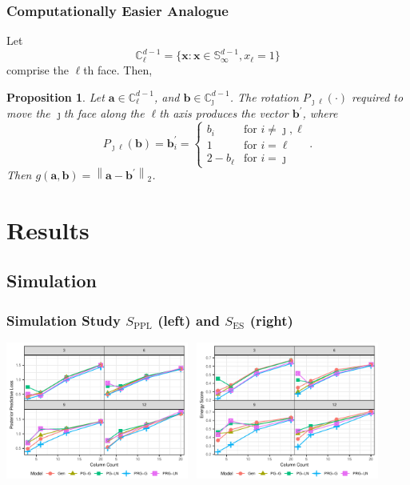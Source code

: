 \documentclass[aspectratio=169]{beamer}
\newcommand{\norm}[1]{\left\lVert #1 \right\rVert}
\newcommand{\pnorm}[2]{\norm{#1}_{#2}}
\newtheorem{prop}{Proposition}
\begin{document}
\begin{frame}
  \frametitle{Computationally Easier Analogue}
  Let \[
      {\mathbb C}_{\ell}^{d-1} = \lbrace \bm{x} : \bm{x} \in {\mathbb S}_{\infty}^{d-1}, x_{\ell} = 1\rbrace
    \] comprise the $\ell$th face.  Then,
  \begin{prop}
    Let $\bm{a} \in {\mathbb C}_{\ell}^{d-1}$, and
    $\bm{b} \in {\mathbb C}_{\jmath}^{d-1}$.  The rotation
    $P_{\jmath\ell}(\cdot)$ required to move the $\jmath$th face
    along the $\ell$th axis produces the vector $\bm{b}^\prime$, where
      \begin{equation}
        \label{eqn:rotation}
        P_{\jmath\ell}(\bm{b}) = \bm{b}^{\prime}_i =
        \begin{cases}
            b_{i} &\text{for }i\neq \jmath,\ell\\
            1 &\text{for }i = \ell\\
            2 - b_{\ell} &\text{for }i = \jmath
        \end{cases}.
      \end{equation}
      Then $g(\bm{a},\bm{b}) = \pnorm{\bm{a} - \bm{b}^{\prime}}{2}$.
  \end{prop}
\end{frame}

\section{Results}
\subsection{Simulation}
\begin{frame}
  \frametitle{Simulation Study $S_{\text{PPL}}$ (left) and $S_{\text{ES}}$ (right)}
  \begin{center}
    \includegraphics[width=0.45\textwidth]{./images/simulation_ppl}~
    \hfill
    \includegraphics[width=0.45\textwidth]{./images/simulation_es}~
  \end{center}
\end{frame}
\end{document}

